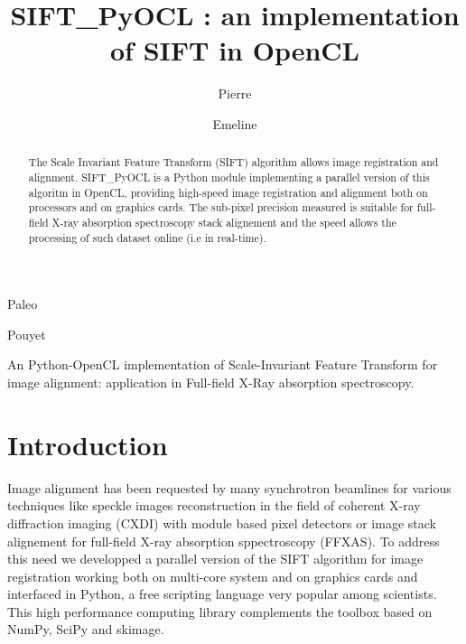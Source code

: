 \documentclass[preprint]{iucr}
\begin{document}
\title{SIFT\_PyOCL : an implementation of SIFT in OpenCL}

    \author[a]{Pierre}{Paleo}
    \author[a]{Emeline}{Pouyet}

\maketitle

\begin{synopsis}
An Python-OpenCL implementation of Scale-Invariant Feature Transform for image
alignment: application in Full-field X-Ray absorption spectroscopy.
\end{synopsis}

\begin{abstract}
The Scale Invariant Feature Transform (SIFT) algorithm allows image registration and alignment.
SIFT\_PyOCL is a Python module implementing a parallel version of this algoritm in OpenCL,
providing high-speed image registration and alignment both on processors and on graphics cards.
The sub-pixel precision measured is suitable for full-field X-ray
absorption spectroscopy stack alignement and the speed allows the processing of
such dataset online (i.e in real-time).

\end{abstract}

\section{Introduction}

Image alignment has been requested by many synchrotron beamlines for
various techniques like speckle images reconstruction in the field of coherent
X-ray diffraction imaging (CXDI) with module based pixel detectors or image
stack alignement for full-field X-ray absorption sppectroscopy (FFXAS).
To address this need we developped a parallel
version of the SIFT algorithm for image registration working both on multi-core
system and on graphics cards and interfaced in Python, a free scripting language
very popular among scientists. This high performance computing library complements
the toolbox based on NumPy\cite{numpy}, SciPy\cite{scipy} and
skimage\cite{skimage}.
\end{document}
